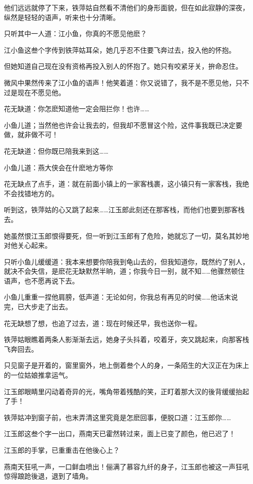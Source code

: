 \documentclass[12pt,oneside]{book}
\begin{document}
他们远远就停了下来，铁萍姑自然看不清他们的身形面貌，但在如此寂静的深夜，纵然是轻轻的语声，听来也十分清晰。

只听其中一人道：江小鱼，你真的不愿见他麽？

江小鱼这叁个字传到铁萍姑耳朵，她几乎忍不住要飞奔过去，投入他的怀抱。

但她知道自己现在没有资格再投入别人的怀抱了。她只有咬紧牙关，拚命忍住。

微风中果然传来了江小鱼的语声！他笑着道：你又说错了，我不是不愿见他，只不过是现在不愿见他。

花无缺道：你怎麽知道他一定会阻拦你！也许\ldots\ldots{}

小鱼儿道；当然他也许会让我去的，但我却不愿冒这个险，这件事我既已决定要做，就非做不可！

花无缺道：但你既已陪我来到这\ldots\ldots{}

小鱼儿道：燕大侠会在什麽地方等你

花无缺点了点手，道：就在前面小镇上的一家客栈裹，这小镇只有一家客栈，我绝不会找错地方的。

听到这，铁萍姑的心又跳了起来\ldots\ldots 江玉郎此刻还在那客栈，而他们也要到那客栈去。

她虽然恨江玉郎恨得要死，但一听到江玉郎有了危险，她就忘了一切，莫名其妙地对他关心起来。

只听小鱼儿缓缓道：我本来想要你陪我到龟山去的，但我知道你，既然约了别人，就决不会失信，是麽花无缺默然半晌，道；你我今日一别，就不知\ldots\ldots 他骤然顿住语声，也不愿再说下去。

小鱼儿重重一捏他肩膀，低声道：无论如何，你我总有再见的时侯\ldots\ldots 他话末说完，已大步走了出去。

花无缺想了想，也追了过去，道：现在时候还早，我也送你一程。

铁萍姑眼瞧着两条人影渐渐去远，她身子头抖着，咬着牙，突又跳起来，向那客栈飞奔回去。

只见窗子是开着的，窗里窗外，地上倒着叁个人的身，一条陌生的大汉正在为床上的一位姑娘推拿运气。

江玉郎眼睛里闪动着奇异的光，嘴角带着残酷的笑，正盯着那大汉的後背缓缓抬起了手！

铁萍姑冲到窗子前，也末弄清这里究竟是怎麽回事，便脱口道：江玉郎你\ldots\ldots{}

江玉郎这叁个字一出口，燕南天已霍然转过来，面上已变了颜色，他已迟了！

江玉郎的手掌，已重重击在他後心上？

燕南天狂吼一声，一口鲜血喷出！俪满了慕容九纤的身子，江玉郎也被这一声狂吼惊得踉跄後退，退到了墙角。
\end{document}
